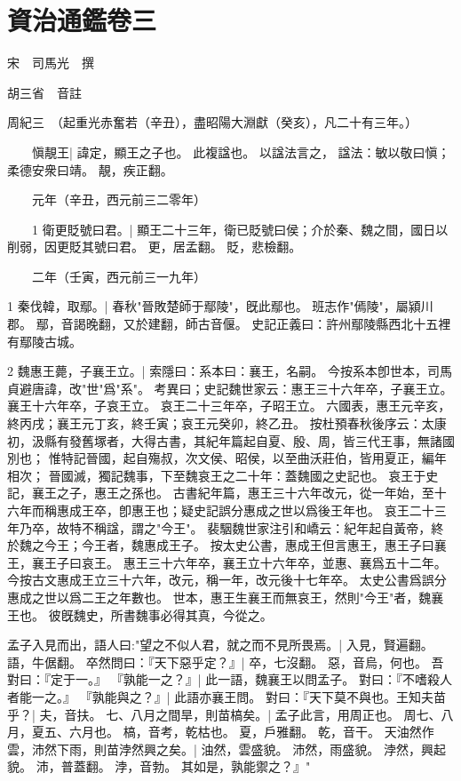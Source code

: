 \chapter{資治通鑑卷三}

宋　司馬光　撰

胡三省　音註

周紀三　（起重光赤奮若（辛丑），盡昭陽大淵獻（癸亥），凡二十有三年。）

　　愼靚王|{
	諱定，顯王之子也。
	此複諡也。
	以諡法言之，
	諡法：敏以敬曰愼；柔德安衆曰靖。
	靚，疾正翻。
}


　　元年（辛丑，西元前三二零年）

　　1 衛更貶號曰君。|{
	顯王二十三年，衛已貶號曰侯；介於秦、魏之間，國日以削弱，因更貶其號曰君。
	更，居孟翻。
	貶，悲檢翻。
}

　　二年（壬寅，西元前三一九年）

1 秦伐韓，取鄢。|{
	春秋"晉敗楚師于鄢陵"，旣此鄢也。
	班志作"傿陵"，屬潁川郡。
	鄢，音謁晚翻，又於建翻，師古音偃。
	史記正義曰：許州鄢陵縣西北十五裡有鄢陵古城。
}

2 魏惠王薨，子襄王立。|{
	索隱曰：系本曰：襄王，名嗣。
	今按系本卽世本，司馬貞避唐諱，改"世"爲"系"。
	考異曰；史記魏世家云：惠王三十六年卒，子襄王立。
	襄王十六年卒，子哀王立。
	哀王二十三年卒，子昭王立。
	六國表，惠王元辛亥，終丙戌；襄王元丁亥，終壬寅；哀王元癸卯，終乙丑。
	按杜預春秋後序云：太康初，汲縣有發舊塚者，大得古書，其紀年篇起自夏、殷、周，皆三代王事，無諸國別也；
	惟特記晉國，起自殤叔，次文侯、昭侯，以至曲沃莊伯，皆用夏正，編年相次；
	晉國滅，獨記魏事，下至魏哀王之二十年：蓋魏國之史記也。
	哀王于史記，襄王之子，惠王之孫也。
	古書紀年篇，惠王三十六年改元，從一年始，至十六年而稱惠成王卒，卽惠王也；疑史記誤分惠成之世以爲後王年也。
	哀王二十三年乃卒，故特不稱諡，謂之"今王"。
	裴駰魏世家注引和嶠云：紀年起自黃帝，終於魏之今王；今王者，魏惠成王子。
	按太史公書，惠成王但言惠王，惠王子曰襄王，襄王子曰哀王。
	惠王三十六年卒，襄王立十六年卒，並惠、襄爲五十二年。
	今按古文惠成王立三十六年，改元，稱一年，改元後十七年卒。
	太史公書爲誤分惠成之世以爲二王之年數也。
	世本，惠王生襄王而無哀王，然則"今王"者，魏襄王也。
	彼旣魏史，所書魏事必得其真，今從之。
}

	孟子入見而出，語人曰:"望之不似人君，就之而不見所畏焉。|{
	入見，賢遍翻。
	語，牛倨翻。
}
卒然問曰：『天下惡乎定？』|{
	卒，七沒翻。
	惡，音烏，何也。
}
吾對曰：『定于一。』
『孰能一之？』|{
	此一語，魏襄王以問孟子。
}
對曰：『不嗜殺人者能一之。』
『孰能與之？』|{
	此語亦襄王問。
}
對曰：『天下莫不與也。王知夫苗乎？|{
	夫，音扶。
}
七、八月之間旱，則苗槁矣。|{
	孟子此言，用周正也。
	周七、八月，夏五、六月也。
	槁，音考，乾枯也。
	夏，戶雅翻。
	乾，音干。
}
天油然作雲，沛然下雨，則苗浡然興之矣。|{
	油然，雲盛貌。
	沛然，雨盛貌。
	浡然，興起貌。
	沛，普蓋翻。
	浡，音勃。
}
其如是，孰能禦之？』"

